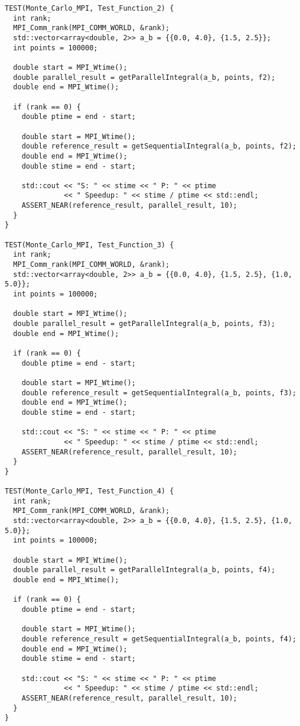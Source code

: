 \documentclass{report}
\begin{document}
\begin{lstlisting}
TEST(Monte_Carlo_MPI, Test_Function_2) {
  int rank;
  MPI_Comm_rank(MPI_COMM_WORLD, &rank);
  std::vector<array<double, 2>> a_b = {{0.0, 4.0}, {1.5, 2.5}};
  int points = 100000;

  double start = MPI_Wtime();
  double parallel_result = getParallelIntegral(a_b, points, f2);
  double end = MPI_Wtime();

  if (rank == 0) {
    double ptime = end - start;

    double start = MPI_Wtime();
    double reference_result = getSequentialIntegral(a_b, points, f2);
    double end = MPI_Wtime();
    double stime = end - start;

    std::cout << "S: " << stime << " P: " << ptime
              << " Speedup: " << stime / ptime << std::endl;
    ASSERT_NEAR(reference_result, parallel_result, 10);
  }
}

TEST(Monte_Carlo_MPI, Test_Function_3) {
  int rank;
  MPI_Comm_rank(MPI_COMM_WORLD, &rank);
  std::vector<array<double, 2>> a_b = {{0.0, 4.0}, {1.5, 2.5}, {1.0, 5.0}};
  int points = 100000;

  double start = MPI_Wtime();
  double parallel_result = getParallelIntegral(a_b, points, f3);
  double end = MPI_Wtime();

  if (rank == 0) {
    double ptime = end - start;

    double start = MPI_Wtime();
    double reference_result = getSequentialIntegral(a_b, points, f3);
    double end = MPI_Wtime();
    double stime = end - start;

    std::cout << "S: " << stime << " P: " << ptime
              << " Speedup: " << stime / ptime << std::endl;
    ASSERT_NEAR(reference_result, parallel_result, 10);
  }
}

TEST(Monte_Carlo_MPI, Test_Function_4) {
  int rank;
  MPI_Comm_rank(MPI_COMM_WORLD, &rank);
  std::vector<array<double, 2>> a_b = {{0.0, 4.0}, {1.5, 2.5}, {1.0, 5.0}};
  int points = 100000;

  double start = MPI_Wtime();
  double parallel_result = getParallelIntegral(a_b, points, f4);
  double end = MPI_Wtime();

  if (rank == 0) {
    double ptime = end - start;

    double start = MPI_Wtime();
    double reference_result = getSequentialIntegral(a_b, points, f4);
    double end = MPI_Wtime();
    double stime = end - start;

    std::cout << "S: " << stime << " P: " << ptime
              << " Speedup: " << stime / ptime << std::endl;
    ASSERT_NEAR(reference_result, parallel_result, 10);
  }
}


\end{lstlisting}
\end{document}
